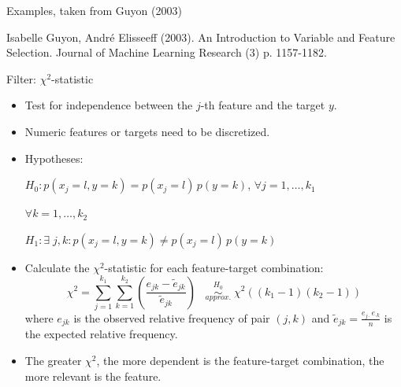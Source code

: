 \documentclass[11pt,compress,t,notes=noshow, xcolor=table]{beamer}
\begin{document}
\begin{vbframe}{Examples, taken from Guyon (2003)}
  \begin{center}
  \footnotesize{Isabelle Guyon, André Elisseeff (2003). An Introduction to Variable and Feature Selection.  Journal of Machine Learning Research (3) p. 1157-1182.}
  \end{center}

  \end{vbframe}



  \begin{vbframe}{Filter: $\chi^2$-statistic}
  \begin{itemize}
    \item Test for independence between the $j$-th feature and the target $y$.
    \item Numeric features or targets need to be discretized.
    \item Hypotheses:

    $H_0: p(x_j = l, y = k) = p(x_j = l)\, p(y = k)$, $\forall j = 1, \dots, k_1$

    \noindent\hspace*{6.55cm} $\forall k = 1, \dots, k_2$

    $H_1: \exists \; j, k: p(x_j = l, y = k) \neq p(x_j = l)\, p(y = k)$
    \item Calculate the $\chi^2$-statistic for each feature-target combination:
      $$ \chi^2 = \sum_{j = 1}^{k_1} \sum_{k=1}^{k_2} (\frac{e_{jk} - \tilde{e}_{jk}}{\tilde{e}_{jk}}) \;\;\;   \stackrel{H_0}{\underset{approx.}{\sim}} \; \chi^2 ((k_1-1)(k_2-1))$$
    where $e_{jk}$ is the observed relative frequency of pair $(j,k)$ and $\tilde{e}_{jk} = \frac{e_{j \cdot} e_{\cdot k}}{n}$ is the expected relative frequency.
    \item The greater $\chi^2$, the more dependent is the feature-target combination, the more relevant is the feature.
  \end{itemize}
  \end{vbframe}
\end{document}
